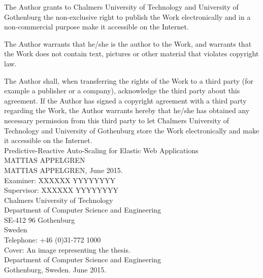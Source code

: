 The Author grants to Chalmers University of Technology and University of Gothenburg the non-exclusive right to publish the Work electronically and in a non-commercial purpose make it accessible on the Internet.

The Author warrants that he/she is the author to the Work, and warrants that the Work does not contain text, pictures or other material that violates copyright law.

The Author shall, when transferring the rights of the Work to a third party (for example a publisher or a company), acknowledge the third party about this agreement.  If the Author has signed a copyright agreement with a third party regarding the Work, the Author warrants hereby that he/she has obtained any necessary permission from this third party to let Chalmers University of Technology and University of Gothenburg store the Work electronically and make it accessible on the Internet.\\[.3cm]

Predictive-Reactive Auto-Scaling for Elastic Web Applications\\
MATTIAS APPELGREN\\[.2cm]

\textcopyright MATTIAS APPELGREN, June 2015.\\[.2cm]

Examiner: XXXXXX YYYYYYYY\\
Supervisor: XXXXXX YYYYYYYY\\[.2cm]

Chalmers University of Technology\\
Department of Computer Science and Engineering\\
SE-412 96 Gothenburg\\
Sweden\\
Telephone: +46 (0)31-772 1000\\[.3cm]

Cover: An image representing the thesis.\\[.3cm]

Department of Computer Science and Engineering\\
Gothenburg, Sweden. June 2015.
